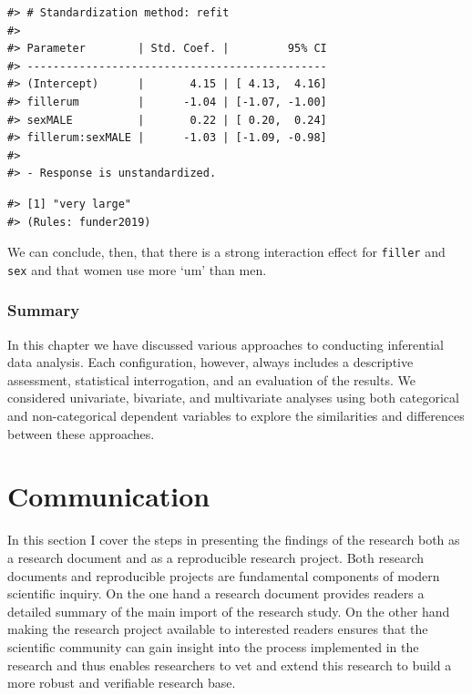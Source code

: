 \documentclass[
  letterpaper,
]{scrbook}
\newenvironment{Shaded}{\begin{snugshade}}{\end{snugshade}}
\newcommand{\CommentTok}[1]{\textcolor[rgb]{0.00,0.00,0.00}{\textit{#1}}}
\newcommand{\DecValTok}[1]{\textcolor[rgb]{0.00,0.00,0.00}{#1}}
\newcommand{\FunctionTok}[1]{\textcolor[rgb]{0.00,0.00,0.00}{#1}}
\newcommand{\NormalTok}[1]{\textcolor[rgb]{0.00,0.00,0.00}{#1}}
\newcommand{\SpecialCharTok}[1]{\textcolor[rgb]{0.00,0.00,0.00}{#1}}
\begin{document}
\begin{verbatim}
#> # Standardization method: refit
#> 
#> Parameter        | Std. Coef. |         95% CI
#> ----------------------------------------------
#> (Intercept)      |       4.15 | [ 4.13,  4.16]
#> fillerum         |      -1.04 | [-1.07, -1.00]
#> sexMALE          |       0.22 | [ 0.20,  0.24]
#> fillerum:sexMALE |      -1.03 | [-1.09, -0.98]
#> 
#> - Response is unstandardized.
\end{verbatim}

\begin{Shaded}
\end{Shaded}

\begin{verbatim}
#> [1] "very large"
#> (Rules: funder2019)
\end{verbatim}

We can conclude, then, that there is a strong interaction effect for
\texttt{filler} and \texttt{sex} and that women use more `um' than men.

\hypertarget{summary-13}{%
\section{Summary}\label{summary-13}}

In this chapter we have discussed various approaches to conducting
inferential data analysis. Each configuration, however, always includes
a descriptive assessment, statistical interrogation, and an evaluation
of the results. We considered univariate, bivariate, and multivariate
analyses using both categorical and non-categorical dependent variables
to explore the similarities and differences between these approaches.

\part{Communication}

In this section I cover the steps in presenting the findings of the
research both as a research document and as a reproducible research
project. Both research documents and reproducible projects are
fundamental components of modern scientific inquiry. On the one hand a
research document provides readers a detailed summary of the main import
of the research study. On the other hand making the research project
available to interested readers ensures that the scientific community
can gain insight into the process implemented in the research and thus
enables researchers to vet and extend this research to build a more
robust and verifiable research base.
\end{document}
